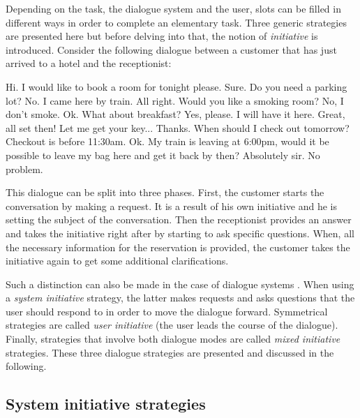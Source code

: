 	Depending on the task, the dialogue system and the user, slots can be filled in different ways in order to complete an elementary task. Three generic strategies are presented here but before delving into that, the notion of \textit{initiative} is introduced. Consider the following dialogue between a customer that has just arrived to a hotel and the receptionist:
	
	\begin{dialogue}
		 Hi. I would like to book a room for tonight please.
		 Sure. Do you need a parking lot?
		 No. I came here by train.
		 All right. Would you like a smoking room?
		 No, I don't smoke.
		 Ok. What about breakfast?
		 Yes, please. I will have it here.
		 Great, all set then! Let me get your key...
		 Thanks. When should I check out tomorrow?
		 Checkout is before 11:30am.
		 Ok. My train is leaving at 6:00pm, would it be possible to leave my bag here and get it back by then?
		 Absolutely sir. No problem.
	\end{dialogue}

	This dialogue can be split into three phases. First, the customer starts the conversation by making a request. It is a result of his own initiative and he is setting the subject of the conversation. Then the receptionist provides an answer and takes the initiative right after by starting to ask specific questions. When, all the necessary information for the reservation is provided, the customer takes the initiative again to get some additional clarifications.
	
	Such a distinction can also be made in the case of dialogue systems \cite{Ferguson2007}. When using a \textit{system initiative} strategy, the latter makes requests and asks questions that the user should respond to in order to move the dialogue forward. Symmetrical strategies are called \textit{user initiative} (the user leads the course of the dialogue). Finally, strategies that involve both dialogue modes are called \textit{mixed initiative} strategies. These three dialogue strategies are presented and discussed in the following.
	
	\subsection{System initiative strategies}
	
